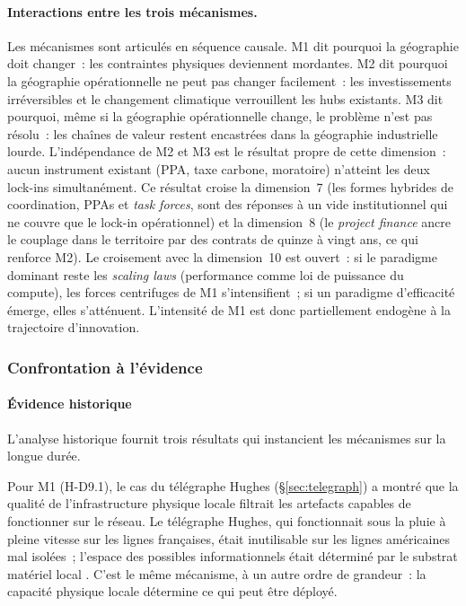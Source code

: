 \paragraph{Interactions entre les trois mécanismes.} Les mécanismes sont articulés en séquence causale. M1 dit pourquoi la géographie doit changer~: les contraintes physiques deviennent mordantes. M2 dit pourquoi la géographie opérationnelle ne peut pas changer facilement~: les investissements irréversibles et le changement climatique verrouillent les hubs existants. M3 dit pourquoi, même si la géographie opérationnelle change, le problème n'est pas résolu~: les chaînes de valeur restent encastrées dans la géographie industrielle lourde. L'indépendance de M2 et M3 est le résultat propre de cette dimension~: aucun instrument existant (PPA, taxe carbone, moratoire) n'atteint les deux lock-ins simultanément. Ce résultat croise la dimension~7 (les formes hybrides de coordination, PPAs et \emph{task forces}, sont des réponses à un vide institutionnel qui ne couvre que le lock-in opérationnel) et la dimension~8 (le \emph{project finance} ancre le couplage dans le territoire par des contrats de quinze à vingt ans, ce qui renforce M2). Le croisement avec la dimension~10 est ouvert~: si le paradigme dominant reste les \emph{scaling laws} (performance comme loi de puissance du compute), les forces centrifuges de M1 s'intensifient~; si un paradigme d'efficacité émerge, elles s'atténuent. L'intensité de M1 est donc partiellement endogène à la trajectoire d'innovation.


\subsubsection{Confrontation à l'évidence}

\paragraph{Évidence historique}

L'analyse historique fournit trois résultats qui instancient les mécanismes sur la longue durée.

Pour M1 (H-D9.1), le cas du télégraphe Hughes (§\ref{sec:telegraph}) a montré que la qualité de l'infrastructure physique locale filtrait les artefacts capables de fonctionner sur le réseau. Le télégraphe Hughes, qui fonctionnait sous la pluie à pleine vitesse sur les lignes françaises, était inutilisable sur les lignes américaines mal isolées~; l'espace des possibles informationnels était déterminé par le substrat matériel local \parencite{brooks_report_1875}. C'est le même mécanisme, à un autre ordre de grandeur~: la capacité physique locale détermine ce qui peut être déployé.

